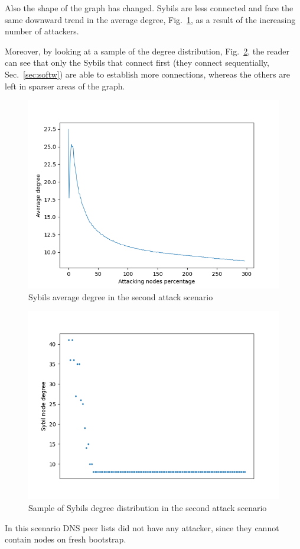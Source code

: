 Also the shape of the graph has changed. Sybils are less connected and face the same downward trend in the average degree, Fig.~\ref{fig:ex-atk-degree}, as a result of the increasing number of attackers.

Moreover, by looking at a sample of the degree distribution, Fig.~\ref{fig:dd}, the reader can see that only the Sybils that connect first (they connect sequentially, Sec.~\ref{sec:softw}) are able to establish more connections, whereas the others are left in sparser areas of the graph.\par

\begin{figure}[h!]
	\includegraphics[width=.8\textwidth]{pict/results/ex-atk-avg-degree.png}
	\centering
	\caption{Sybils average degree in the second attack scenario}
	\label{fig:ex-atk-degree}
\end{figure}

\begin{figure}[h!]
	\includegraphics[width=.8\textwidth]{pict/results/ex-atk-dd.png}
	\centering
	\caption{Sample of Sybils degree distribution in the second attack scenario}
	\label{fig:dd}
\end{figure}

In this scenario DNS peer lists did not have any attacker, since they cannot contain nodes on fresh bootstrap.